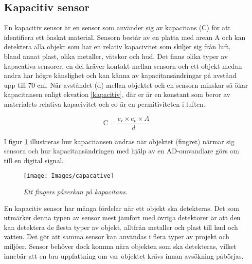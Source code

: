 \documentclass[11pt]{article}
\begin{document}
\begin{flushleft}
\subsection{Kapacitiv sensor}
En kapacitiv sensor är en sensor som använder sig av kapacitans (C) för att identifiera ett önskat material. Sensorn består av en platta med arean A och kan detektera alla objekt som har en relativ kapacivitet som skiljer sig från luft, bland annat plast, olika metaller, vätskor och hud. Det finns olika typer av kapacativa sensorer, en del kräver kontakt mellan sensorn och ett objekt medan andra har högre känslighet och kan känna av kapacitansändringar på avstånd upp till 70 cm. När avståndet (d) mellan objektet och en sensorn minskar så ökar kapacitansen enligt ekvation \ref{kapacitiv}, där er är en konstant som beror av materialets relativa kapacivitet och eo är en permitiviteten i luften.\cite{website:capacative}


\begin{equation}\label{kapacitiv}
	\textrm{C} = \frac {e_{r} \times e_{o} \times A}{d}						
\end{equation}

I figur \ref{capacative} illustreras hur kapacitansen ändras när objektet (fingret) närmar sig sensorn och hur kapacitansändringen med hjälp av en AD-omvandlare görs om till en digital signal. 

\begin{figure}[htbp]
	\centering
	\texttt{[image: Images/capacative]}
	\caption{\textit{Ett fingers påverkan på kapacitans.}\label{capacative}}
\end{figure}

En kapacitiv sensor har många fördelar när ett objekt ska detekteras. Det som utmärker denna typen av sensor mest jämfört med övriga detektorer är att den kan detektera de flesta typer av objekt, alltfrån metaller och plast till hud och vatten. Det gör att samma sensor kan användas i flera typer av projekt och miljöer. Sensor behöver dock komma nära objekten som ska detekteras, vilket innebär att en bra uppfattning om var objektet krävs innan avsökning påbörjas. \cite{website:capacative}




\end{flushleft}
\end{document}

